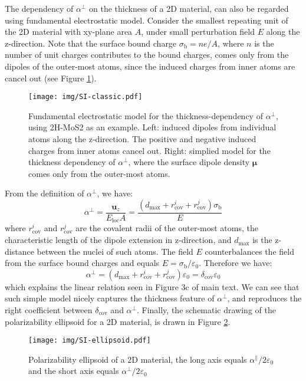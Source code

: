 \documentclass[manuscript=suppinfo,email=true,hyperref=true,keywords=false]{achemso}
\begin{document}
The dependency of $\alpha^{\perp}$ on the thickness of a 2D material,
can also be regarded using fundamental electrostatic model. Consider
the smallest repeating unit of the 2D material with xy-plane area $A$,
under small perturbation field $E$ along the z-direction.  Note that
the surface bound charge $\sigma_{\mathrm{b}}=n e /A$, where $n$ is
the number of unit charges contributes to the bound charges, comes
only from the dipoles of the outer-most atoms, since the induced
charges from inner atoms are cancel out (see Figure \ref{fig:classic-model}).
\begin{figure}[htbp]
  \centering
  \texttt{[image: img/SI-classic.pdf]}
  \caption{Fundamental electrostatic model for the
    thickness-dependency of $\alpha^{\perp}$, using 2H-MoS2 as an
    example. Left: induced dipoles from individual atoms along the
    z-direction. The positive and negative induced charges from inner
    atoms cancel out. Right: simplied model for the thickness
    dependency of $\alpha^{\perp}$, where the surface dipole density
    $\boldsymbol{\mu}$ comes only from the outer-most atoms.}
  \label{fig:classic-model}
\end{figure}
From the definition of
$\alpha^{\perp}$, we have:
\begin{equation}
  \label{eq:alpha-classic}
  \alpha^{\perp} = \frac{\boldsymbol{u}_{z}}{E_{\mathrm{loc}} A}
  = \frac{(d_{\mathrm{max}} + r_{\mathrm{cov}}^{i} + r_{\mathrm{cov}}^{j}) \sigma_{\mathrm{b}}}{E}
\end{equation}
where $r_{\mathrm{cov}}^{i}$ and $r_{\mathrm{cov}}^{j}$ are the
covalent radii of the outer-most atoms, the characteristic length of
the dipole extension in z-direction, and $d_{\mathrm{max}}$ is the
z-distance between the nuclei of such atoms.  The field $E$
counterbalances the field from the surface bound charges and equals
$E = \sigma_{\mathrm{b}}/\varepsilon_{0}$. Therefore we have:
\begin{equation}
  \label{eq:alpha-classic-2}
  \alpha^{\perp} = (d_{\mathrm{max}} + r_{\mathrm{cov}}^{i} + r_{\mathrm{cov}}^{j})\varepsilon_{0}
                = \delta_{\mathrm{cov}} \varepsilon_{0}
\end{equation}
which explains the linear relation seen in Figure 3c of main text. We
can see that such simple model nicely captures the thickness feature
of $\alpha^{\perp}$, and reproduces the right coefficient between
$\delta_{\mathrm{cov}}$ and $\alpha^{\perp}$. Finally, the schematic
drawing of the polarizability ellipsoid for a 2D material, is drawn in
Figure \ref{fig:ellipsoid}.
\begin{figure}[htbp]
  \centering
  \texttt{[image: img/SI-ellipsoid.pdf]}
  \caption{Polarizability ellipsoid of a 2D material, the long axis
    equals $\alpha^{\parallel}/2\varepsilon_{0}$ and the short axis
    equals  $\alpha^{\perp}/2\varepsilon_{0}$}
  \label{fig:ellipsoid}
\end{figure}
\end{document}

